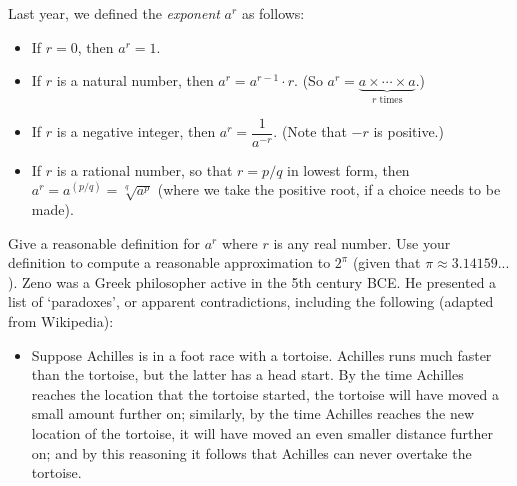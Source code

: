 \begin{questions}
  \questioS Last year, we defined the \emph{exponent} $ a^r $ as follows:
            \begin{itemize}
              \item If $ r = 0 $, then $ a^r = 1 $.
              \item If $ r $ is a natural number, then $ a^r = a^{r - 1} \cdot r $. (So $ a^r =\underbrace{a \times \cdots \times a}_{r \text{ times}} $.)
              \item If $ r $ is a negative integer, then $ a^r = \dfrac{1}{a^{-r}} $. (Note that $ -r $ is positive.)
              \item If $ r $ is a rational number, so that $ r = p/q $ in lowest form, then $ a^r = a^{(p/q)} = \sqrt[q]{a^p} $ (where we take the positive root,
                    if a choice needs to be made).
            \end{itemize}
            Give a reasonable definition for $ a^r $ where $ r $ is any real number. Use your definition to compute a reasonable approximation to $ 2^\pi $
            (given that $ \pi \approx 3.14159...$).
  \clearpage
  \questioS Zeno was a Greek philosopher active in the 5th century BCE. He presented a list of `paradoxes', or apparent contradictions,
            including the following (adapted from Wikipedia):
            \begin{itemize}
              \item Suppose Achilles is in a foot race with a tortoise. Achilles runs much faster than the tortoise, but the latter
                    has a head start. By the time Achilles reaches the location that the tortoise started, the tortoise will have moved
                    a small amount further on; similarly, by the time Achilles reaches the new location of the tortoise, it will have moved
                    an even smaller distance further on; and by this reasoning it follows that Achilles can never overtake the tortoise.

\end{itemize}
\end{questions}
